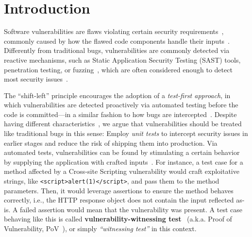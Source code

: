 \section{Introduction}
\label{sec:intro}

Software vulnerabilities are flaws violating certain security requirements~\cite{frei:weis2010:cve,mcgraw:2006:building:security:in}, commonly caused by how the flawed code components handle their inputs~\cite{li:ccs2017:patches}.
Differently from traditional bugs, vulnerabilities are commonly detected via reactive mechanisms, such as Static Application Security Testing (SAST) tools, penetration testing, or fuzzing~\cite{lipp:issta2022,austin:ist2013,Shahriar:csur2012,kaur:coconet2019}, which are often considered enough to detect most security issues~\cite{Elder:emse2022:really,Cruzes:2017:agile:sectests}.

The ``shift-left'' principle encourages the adoption of a \textit{test-first approach}, in which vulnerabilities are detected proactively via automated testing before the code is committed---in a similar fashion to how bugs are intercepted~\cite{mcgraw:2006:building:security:in,Gonzalez:esem2021:challenge:sectests}.
Despite having different characteristics~\cite{Camilo:msr2015:bug:vulns,canfora:cs2020:bug:vulns}, we argue that vulnerabilities should be treated like traditional bugs in this sense: Employ \textit{unit tests} to intercept security issues in earlier stages and reduce the risk of shipping them into production.
Via automated tests, vulnerabilities can be found by stimulating a certain behavior by supplying the application with crafted inputs~\cite{felderer:2016:survey:sectests,Cruzes:2017:agile:sectests,Mohammadi:ase2016:xss:unit}.
For instance, a test case for a method affected by a Cross-site Scripting vulnerability would craft exploitative strings, like \texttt{<script>alert(1)</script>}, and pass them to the method parameters.
Then, it would leverage assertions to ensure the method behaves correctly, i.e., the HTTP response object does not contain the input reflected as-is.
A failed assertion would mean that the vulnerability was present.
A test case behaving like this is called \textbf{vulnerability-witnessing test}~\cite{kang:issta2022:transfer,zhang:2023:llm:sectests} (a.k.a. Proof of Vulnerability, PoV~\cite{pinconschi2021comparative, bui:msr2022:vul4j}), or simply \textsl{``witnessing test''} in this context.

